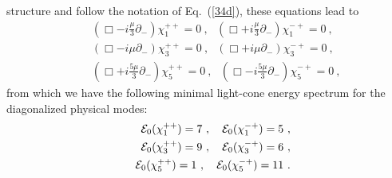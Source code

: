 \documentclass[a4paper,12pt]{article}
\numberwithin{equation}{section}
\begin{document}
structure and follow the notation of Eq.~(\ref{34d}),
these equations lead to
\begin{eqnarray}
& & ( \Box - i \frac{\mu}{3} \partial_- )
         \chi^{++}_1 = 0 ~,~~~
    ( \Box + i \frac{\mu}{3} \partial_- )
         \chi^{-+}_1 = 0 ~,
\nonumber \\
& & ( \Box - i \mu \partial_- )
          \chi^{++}_3 = 0 ~,~~~
    ( \Box + i \mu \partial_- )
          \chi^{-+}_3 = 0 ~,
\nonumber \\
& & ( \Box + i \frac{5 \mu}{3} \partial_- )
     \chi^{++}_5 = 0 ~,~~~
    ( \Box - i \frac{5 \mu}{3} \partial_- )
     \chi^{-+}_5 = 0 ~,
\end{eqnarray}
from which we have the following minimal light-cone energy
spectrum for the diagonalized physical modes:
\begin{eqnarray}
& & {\cal E}_0 (\chi^{++}_1) = 7 ~,~~~
    {\cal E}_0 (\chi^{-+}_1) = 5 ~,
 \nonumber \\
& & {\cal E}_0 (\chi^{++}_3) = 9 ~,~~~
    {\cal E}_0 (\chi^{-+}_3) = 6 ~,
 \nonumber \\
& & {\cal E}_0 (\chi^{++}_5) = 1 ~,~~~
    {\cal E}_0 (\chi^{-+}_5) = 11 ~.
\end{eqnarray}
\end{document}
